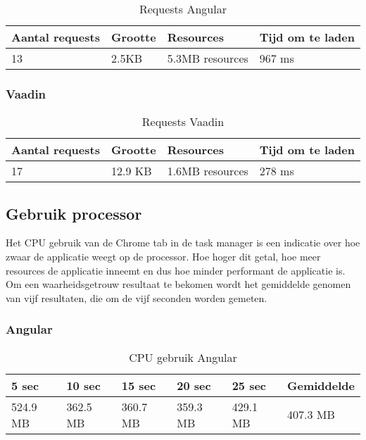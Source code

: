 \begin{table}[H]
	\begin{tabular}{|l|l|l|l|}
		\hline
		\textbf{Aantal requests} & \textbf{Grootte} & \textbf{Resources} & \textbf{Tijd om te laden} \\ \hline
		13                       & 2.5KB            & 5.3MB resources    & 967 ms                    \\ \hline
	\end{tabular}
\caption{Requests Angular}
\label{table:angularRequests}
\end{table}
\subsubsection{Vaadin}
\begin{table}[H]
	\begin{tabular}{|l|l|l|l|}
		\hline
		\textbf{Aantal requests} & \textbf{Grootte} & \textbf{Resources} & \textbf{Tijd om te laden} \\ \hline
		17                       & 12.9 KB          & 1.6MB resources    & 278 ms                    \\ \hline
	\end{tabular}
\caption{Requests Vaadin}
\label{table:vaadinRequests}
\end{table}

\subsection{Gebruik processor}
Het CPU gebruik van de Chrome tab in de task manager is een indicatie over hoe zwaar de applicatie weegt op de processor. Hoe hoger dit getal, hoe meer resources de applicatie inneemt en dus hoe minder performant de applicatie is. Om een waarheidsgetrouw resultaat te bekomen wordt het gemiddelde genomen van vijf resultaten, die om de vijf seconden worden gemeten. 
\subsubsection{Angular}
\begin{table}[H]
	\begin{tabular}{|l|l|l|l|l|l|}
		\hline
		\textbf{5 sec} & \textbf{10 sec} & \textbf{15 sec} & \textbf{20 sec} & \textbf{25 sec} & \textbf{Gemiddelde} \\ \hline
		524.9 MB       & 362.5 MB        & 360.7 MB        & 359.3 MB        & 429.1 MB        & 407.3 MB            \\ \hline
	\end{tabular}
\caption{CPU gebruik Angular}
\label{table:angularCPU}
\end{table}

